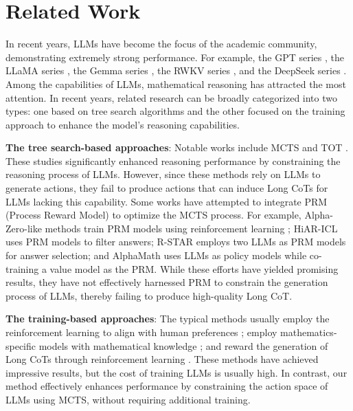 \section{Related Work}
In recent years, LLMs have become the focus of the academic community, demonstrating extremely strong performance. For example, the GPT series \cite{brown2020language,chen2021evaluating,nakano2021webgpt,achiam2023gpt}, the LLaMA series \cite{touvron2023llama,taori2023alpaca,young2024yi,dubey2024llama}, the Gemma series \cite{team2024gemma_a,team2024gemma_b}, the RWKV series \cite{peng2024eagle,peng2023rwkv}, and the DeepSeek series \cite{bi2024deepseek,liu2024deepseek,guo2025deepseek}.
Among the capabilities of LLMs, mathematical reasoning has attracted the most attention. In recent years, related research can be broadly categorized into two types: one based on tree search algorithms and the other focused on the training approach to enhance the model's reasoning capabilities.

\textbf{The tree search-based approaches}: Notable works include MCTS \cite{hao2023reasoning} and TOT \cite{yao2023tree}. These studies significantly enhanced reasoning performance by constraining the reasoning process of LLMs. However, since these methods rely on LLMs to generate actions, they fail to produce actions that can induce Long CoTs for LLMs lacking this capability.  
Some works have attempted to integrate PRM (Process Reward Model) to optimize the MCTS process. For example, Alpha-Zero-like methods train PRM models using reinforcement learning \cite{feng2023alphazero}; HiAR-ICL \cite{wu2024beyond} uses PRM models to filter answers; R-STAR \cite{qi2024mutual} employs two LLMs as PRM models for answer selection; and AlphaMath \cite{chen2024alphamath} uses LLMs as policy models while co-training a value model as the PRM. While these efforts have yielded promising results, they have not effectively harnessed PRM to constrain the generation process of LLMs, thereby failing to produce high-quality Long CoT.


\textbf{The training-based approaches}: The typical methods usually employ the reinforcement learning to align with human preferences \cite{li2023reinforcement,ouyang2022training,rafailov2024direct,ethayarajh2024kto}; employ mathematics-specific models with mathematical knowledge \cite{shao2024deepseekmath,yang2024qwen2b,ying2024internlm}; and reward the generation of Long CoTs through reinforcement learning \cite{guo2025deepseek,zhong2024evaluation,team2024qwq,team2025kimi}. These methods have achieved impressive results, but the cost of training LLMs is usually high. In contrast, our method effectively enhances performance by constraining the action space of LLMs using MCTS, without requiring additional training.


%
